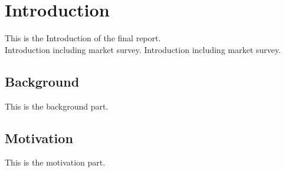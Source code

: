 \section{Introduction} 
This is the Introduction of the final report.\cite{Benner} \\
Introduction including market survey.
Introduction including market survey.
\subsection{Background}
This is the background part.
\subsection{Motivation}
This is the motivation part.

\newpage
